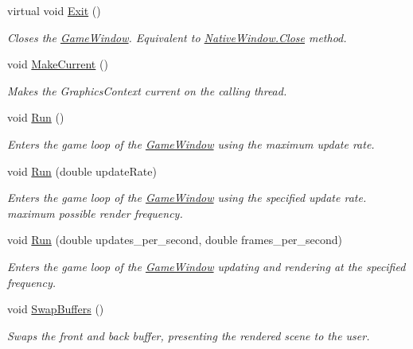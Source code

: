 \begin{DoxyCompactItemize}
virtual void \hyperlink{class_open_t_k_1_1_game_window_a67c26214c431300b56b0f4a88bbbd244}{Exit} ()
\begin{DoxyCompactList}\small\item\em Closes the \hyperlink{class_open_t_k_1_1_game_window}{Game\-Window}. Equivalent to \hyperlink{class_open_t_k_1_1_native_window_ae7dae9eca1c2298dbcdbc34a81304a61}{Native\-Window.\-Close} method. \end{DoxyCompactList}\item 
void \hyperlink{class_open_t_k_1_1_game_window_a84d84a7173903a8d991e6ca3d40a7a4b}{Make\-Current} ()
\begin{DoxyCompactList}\small\item\em Makes the Graphics\-Context current on the calling thread. \end{DoxyCompactList}\item 
void \hyperlink{class_open_t_k_1_1_game_window_a2ead9bd94f36e26e86da79ef548e7d6b}{Run} ()
\begin{DoxyCompactList}\small\item\em Enters the game loop of the \hyperlink{class_open_t_k_1_1_game_window}{Game\-Window} using the maximum update rate. \end{DoxyCompactList}\item 
void \hyperlink{class_open_t_k_1_1_game_window_a0c9d2a547ee1dc8f59ad0e70c2552730}{Run} (double update\-Rate)
\begin{DoxyCompactList}\small\item\em Enters the game loop of the \hyperlink{class_open_t_k_1_1_game_window}{Game\-Window} using the specified update rate. maximum possible render frequency. \end{DoxyCompactList}\item 
void \hyperlink{class_open_t_k_1_1_game_window_aff16d3a5aeb78782c4a9f8e74c8d0e89}{Run} (double updates\-\_\-per\-\_\-second, double frames\-\_\-per\-\_\-second)
\begin{DoxyCompactList}\small\item\em Enters the game loop of the \hyperlink{class_open_t_k_1_1_game_window}{Game\-Window} updating and rendering at the specified frequency. \end{DoxyCompactList}\item 
void \hyperlink{class_open_t_k_1_1_game_window_adeaeff9283d467a5cda90e6b8579543a}{Swap\-Buffers} ()
\begin{DoxyCompactList}\small\item\em Swaps the front and back buffer, presenting the rendered scene to the user. \end{DoxyCompactList}\end{DoxyCompactItemize}
